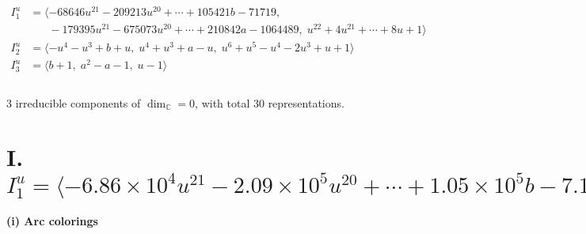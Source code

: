 \documentclass[1p]{elsarticle_modified}
\theoremstyle{definition}
\begin{document}
\begin{align*}
I^u_{1}&=\langle 
-68646 u^{21}-209213 u^{20}+\cdots+105421 b-71719,\\
\phantom{I^u_{1}}&\phantom{= \langle  }-179395 u^{21}-675073 u^{20}+\cdots+210842 a-1064489,\;u^{22}+4 u^{21}+\cdots+8 u+1\rangle \\
I^u_{2}&=\langle 
- u^4- u^3+b+u,\;u^4+u^3+a- u,\;u^6+u^5- u^4-2 u^3+u+1\rangle \\
I^u_{3}&=\langle 
b+1,\;a^2- a-1,\;u-1\rangle \\
\\
\end{align*}
\raggedright * 3 irreducible components of $\dim_{\mathbb{C}}=0$, with total 30 representations.\\
\newpage
\renewcommand{\arraystretch}{1}
\centering \section*{I. $I^u_{1}= \langle -6.86\times10^{4} u^{21}-2.09\times10^{5} u^{20}+\cdots+1.05\times10^{5} b-7.17\times10^{4},\;-1.79\times10^{5} u^{21}-6.75\times10^{5} u^{20}+\cdots+2.11\times10^{5} a-1.06\times10^{6},\;u^{22}+4 u^{21}+\cdots+8 u+1 \rangle$}
\flushleft \textbf{(i) Arc colorings}\\
\end{document}
